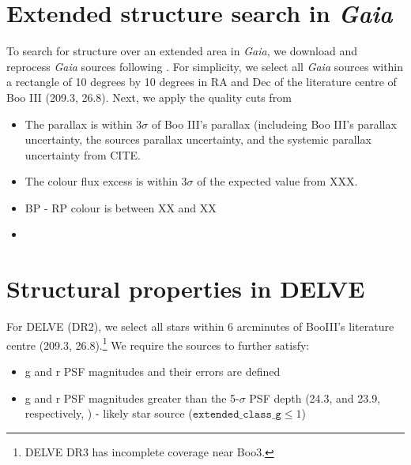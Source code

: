 \documentclass{aa}
\newcommand{\boo}{Boo III}
\newcommand{\pmra}{\ensuremath{\mu_{\alpha*}}}
\newcommand{\pmdec}{\ensuremath{\mu_\delta}}
\newcommand{\masyr}{\ensuremath{\textrm{mas yr}^{-1}}}
\begin{document}





\begin{appendix}


\section{Extended structure search in \textit{Gaia}}

To search for structure over an extended area in \textit{Gaia}, we download and reprocess \textit{Gaia} sources following \citet{MV2020a}. For simplicity, we select all \textit{Gaia} sources within a rectangle of 10 degrees by 10 degrees in RA and Dec of the literature centre of \boo{} (209.3, 26.8). Next, we apply the quality cuts from \citet{MV2020a, MV2020b}
\begin{itemize}
    \item The parallax is within $3\sigma$ of \boo{}'s parallax (includeing \boo{}'s parallax uncertainty, the sources parallax uncertainty, and the systemic parallax uncertainty from CITE. 
    \item The colour flux excess is within $3\sigma$ of the expected value from XXX.
    \item BP - RP colour is between XX and XX
    \item 
\end{itemize}

\section{Structural properties in DELVE}

For DELVE (DR2), we select all stars within 6 arcminutes of BooIII's literature centre (209.3, 26.8).\footnote{DELVE DR3 has incomplete coverage near Boo3.} We require the sources to further satisfy:  
\begin{itemize}
    \item g and r PSF magnitudes and their errors are defined
    \item g and r PSF magnitudes greater than the 5-$\sigma$ PSF depth (24.3, and 23.9, respectively, \citep{delve_dr2})
  - likely star source ($\texttt{extended\_class\_g} \leq 1$)
\end{itemize}


\end{appendix}
\end{document}
